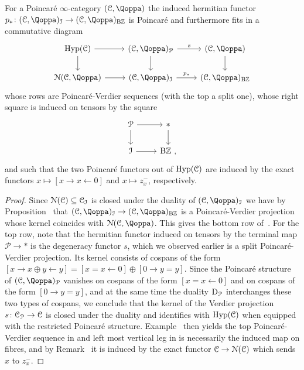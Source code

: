 \begin{proposition}
\label{proposition:PV-sequences-Q1}%
For a Poincaré $\infty$-category $(\C,\QF)$ the induced hermitian functor $p_*\colon (\C,\QF)_\I \to (\C,\QF)_{\B\ZZ}$ is Poincaré and furthermore fits in a commutative diagram
\begin{equation}
\label{equation:tw-S1}%
\begin{tikzcd}
\Hyp(\C) \ar[r]\ar[d] & (\C,\QF)_{\mathcal{P}} \ar[r,"s"]\ar[d] & (\C,\QF) \ar[d] \\
\cN(\C,\QF) \ar[r] & (\C,\QF)_\I \ar[r,"p_*"] & (\C,\QF)_{\B\ZZ} 
\end{tikzcd}
\end{equation}
whose rows are Poincaré-Verdier sequences (with the top a split one), whose right square is induced on tensors by the square
\[
\begin{tikzcd}
\mathcal{P} \ar[r]\ar[d] & \ast \ar[d] \\
\I \ar[r] & \B\ZZ \ ,
\end{tikzcd}
\]
and such that the two Poincaré functors out of $\operatorname{Hyp}(\mathcal C)$ are induced by the exact functors $x \mapsto [x \rightarrow x \leftarrow 0]$ and $x \mapsto z^-_x$, respectively.
\end{proposition}
\begin{proof}
Since $\mathcal{N}(\mathcal C) \subseteq \mathcal C_{\mathcal{I}}$ is closed under the duality of $(\C,\QF)_\I$ we have by Proposition~\; that $(\C,\QF)_\I \to (\C,\QF)_{\B\ZZ}$ is a Poincaré-Verdier projection whose kernel coincides with $\cN(\C,\QF)$. This gives the bottom row of~.
For the top row, note that the hermitian functor induced on tensors by the terminal map $\mathcal{P} \to \ast$ is the degeneracy functor 
$s$, which we observed earlier is a split Poincaré-Verdier projection. 
Its kernel consists of cospans of the form
$[x \rightarrow x \oplus y \leftarrow y] = [x = x \leftarrow 0] \oplus [0 \rightarrow y = y]$.
Since the Poincaré structure of $(\C,\QF)_{\mathcal{P}}$ vanishes on cospans of the form $[x = x \leftarrow 0]$ and on cospans of the form $[0 \rightarrow y = y]$, and at the same time the duality $\mathrm{D}_{\mathcal{P}}$ interchanges these two types of cospans, we conclude that the kernel of the Verdier projection $s\colon \mathcal C_{\mathcal{P}} \to \mathcal C$ is closed under the duality and identifies with $\operatorname{Hyp}(\mathcal C)$ when equipped with the restricted Poincaré structure. Example~ then yields the top Poincaré-Verdier sequence in  and left most vertical leg in  is necessarily the induced map on fibres, and by Remark~ 
it is induced by the exact functor $\mathcal C \to \mathcal{N}(\mathcal C)$ which sends $x$ to $z_x^-$.
\end{proof}


